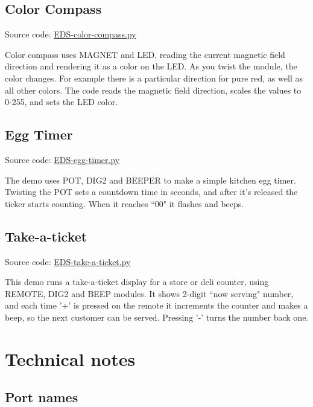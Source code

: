 \documentclass{article}
\begin{document}
\subsection{Color Compass}

Source code: \href{https://github.com/jamesbowman/i2cdriver/blob/master/python/samples/EDS-color-compass.py}{EDS-color-compass.py}

Color compass uses MAGNET and LED, reading the current magnetic field direction and rendering it as a color on the LED.
As you twist the module, the color changes.
For example there is a particular direction for pure red, as well as all other colors.
The code
reads the magnetic field direction, scales the values to 0-255, and sets the LED color.

\subsection{Egg Timer}

Source code: \href{https://github.com/jamesbowman/i2cdriver/blob/master/python/samples/EDS-egg-timer.py}{EDS-egg-timer.py}

The demo uses POT, DIG2 and BEEPER to make a simple kitchen egg timer.
Twisting the POT sets a countdown time in seconds,
and after it's released the ticker starts counting.
When it reaches ``00" it flashes and beeps.

\subsection{Take-a-ticket}

Source code: \href{https://github.com/jamesbowman/i2cdriver/blob/master/python/samples/EDS-take-a-ticket.py}{EDS-take-a-ticket.py}

This demo runs a take-a-ticket display for a store or deli counter,
using REMOTE, DIG2 and BEEP modules.
It shows 2-digit ``now serving" number, and each time '+' is
pressed on the remote it increments the counter and
makes a beep, so the next customer can be served.
Pressing '-' turns the number back one.

\newpage
\section{Technical notes}

\subsection{Port names}
\end{document}
